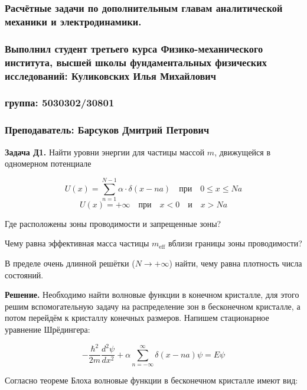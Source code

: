 \documentclass[a4paper, 12pt]{article}
\begin{document}
	
	\begin{center}
		\subsubsection*{Расчётные задачи по дополнительным главам аналитической механики и электродинамики.}
		\subsubsection*{Выполнил студент третьего курса Физико-механического института, высшей школы фундаментальных физических исследований: Куликовских Илья Михайлович}
		\subsubsection*{группа: 5030302/30801}
		\subsubsection*{Преподаватель: Барсуков Дмитрий Петрович}
	\end{center}
	
	\quad \textbf{Задача Д1. } Найти уровни энергии для частицы массой \( m \), движущейся в одномерном потенциале
	
	\[
	U(x) = \sum_{n=1}^{N-1} \alpha \cdot \delta (x - na) \quad \text{при} \quad 0 \leq x \leq Na
	\]
	\[
	U(x) = +\infty \quad \text{при} \quad x < 0 \quad \text{и} \quad x > Na
	\]
	
	Где расположены зоны проводимости и запрещенные зоны?
	
	Чему равна эффективная масса частицы \( m_{\text{eff}} \) вблизи границы зоны проводимости?
	
	В пределе очень длинной решётки (\( N \to +\infty \)) найти, чему равна плотность числа состояний.
	
	\quad \textbf{Решение.} Необходимо найти волновые функции в конечном кристалле, для этого решим вспомогательную задачу на распределение зон в бесконечном кристалле, а потом перейдём к кристаллу конечных размеров. Напишем стационарное уравнение Шрёдингера: 
	
	\begin{equation}
		-\dfrac{\hbar^2}{2m} \dfrac{d^2 \psi}{dx^2} + \alpha\displaystyle\sum\limits_{n=-\infty}^{\infty} \delta(x-na) \psi = E\psi
	\end{equation}
	
	\quad Согласно теореме Блоха волновые функции в бесконечном кристалле имеют вид: 
	
\end{document}
